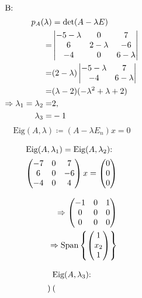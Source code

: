 \documentclass{HM}
\newcommand{\Eig}{\text{Eig}}
\newcommand{\Span}{\text{Span}}
\begin{document}
\begin{enumerate}
		\begin{align*}
			\intertext{B:}
			p_A(\lambda)&=\det(A-\lambda E)\\
			=&\begin{vmatrix}
				-5-\lambda&0&7\\
				6&2-\lambda&-6\\
				-4&0&6-\lambda\\
			\end{vmatrix}\\
			=&(2-\lambda)\begin{vmatrix}
				-5-\lambda&7\\
				-4&6-\lambda\\
			\end{vmatrix}\\
			=&(\lambda-2)(-\lambda^2+\lambda+2)\\
			\Rightarrow\lambda_1=\lambda_2=&2,\\
			\lambda_3=&-1
		\end{align*}
		$$\Eig(A,\lambda)\coloneqq (A-\lambda E_n)x=0$$
		\begin{minipage}{.5\textwidth}
			\begin{align*}
			\intertext{$\Eig(A, \lambda_1)=\Eig(A, \lambda_2)$:}
			\begin{pmatrix}
				-7&0&7\\
				6&0&-6\\
				-4&0&4
			\end{pmatrix}x=\begin{pmatrix}
				0\\0\\0
			\end{pmatrix}\\
			\intertext{}
			\Rightarrow\begin{pmatrix}
				-1&0&1\\
				0&0&0\\
				0&0&0
			\end{pmatrix}\\
			\Rightarrow\Span\left\lbrace\begin{pmatrix}
				1\\
				x_2\\
				1
			\end{pmatrix}\right\rbrace
			\end{align*}
		\end{minipage}
		\begin{minipage}{.5\textwidth}
			\begin{align*}
			\intertext{$\Eig(A, \lambda_3)$:}
			\begin{pmatrix}

\end{pmatrix}
\end{align*}
\end{minipage}
\end{enumerate}
\end{document}
